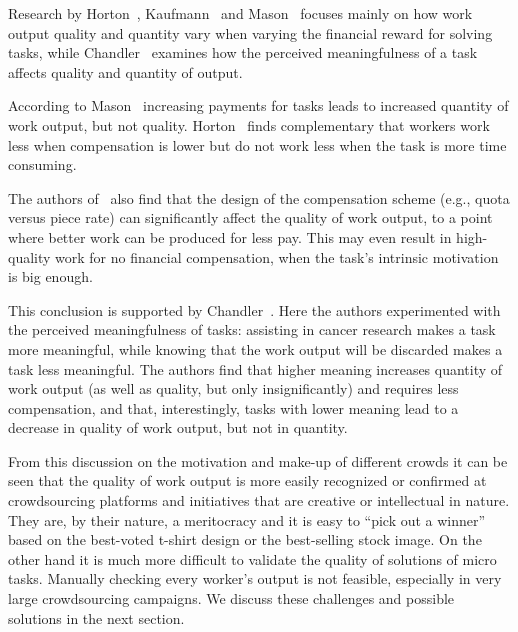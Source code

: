 \documentclass{sig-alternate}
\begin{document}
Research by Horton~\cite{horton2010labor}, Kaufmann~\cite{kaufmann2011more} and
Mason~\cite{mason2010financial} focuses mainly on how work output quality and quantity
vary when varying the financial reward for solving tasks,
while Chandler~\cite{chandler2013breaking} examines how the perceived
meaningfulness of a task affects quality and quantity of output.

According to Mason~\cite{mason2010financial} increasing payments for tasks
leads to increased quantity of work output, but not quality.
Horton~\cite{horton2010labor} finds complementary that workers work less when
compensation is lower but do not work less when the task is more time
consuming. 

The authors of~\cite{mason2010financial} also find that the design of the
compensation scheme (e.g., quota versus piece rate) can significantly affect
the quality of work output, to a point where better work can be produced for
less pay. This may even result in high-quality work for no financial
compensation, when the task's intrinsic motivation is big enough.

This conclusion is supported by Chandler~\cite{chandler2013breaking}. Here the
authors experimented with the perceived meaningfulness of tasks: assisting in
cancer research makes a task more meaningful, while knowing that the work
output will be discarded makes a task less meaningful. The authors find that
higher meaning increases quantity of work output (as well as quality, but only
insignificantly) and requires less compensation, and that, interestingly, tasks
with lower meaning lead to a decrease in quality of work output, but not in
quantity. 

From this discussion on the motivation and make-up of different crowds it can
be seen that the quality of work output is more easily recognized or confirmed
at crowdsourcing platforms and initiatives that are creative or intellectual in
nature. They are, by their nature, a meritocracy and it is easy to ``pick out a
winner'' based on the best-voted t-shirt design or the best-selling stock
image. On the other hand it is much more difficult to validate the quality of
solutions of micro tasks. Manually checking every worker's output is not
feasible, especially in very large crowdsourcing campaigns. We discuss these
challenges and possible solutions in the next section.

\end{document}
